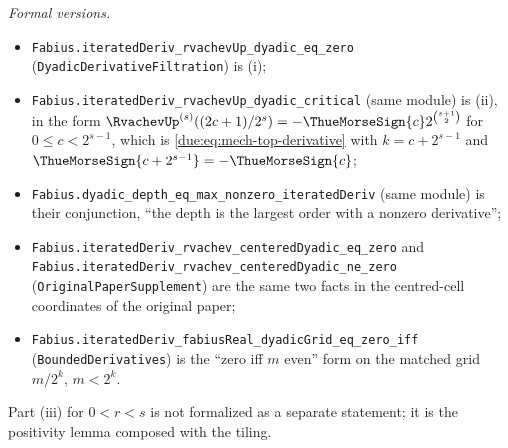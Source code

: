 \documentclass[11pt,oneside]{article}
\theoremstyle{plain}
\theoremstyle{definition}
\theoremstyle{remark}
\begin{document}
\emph{Formal versions.}
\begin{sloppypar}
\begin{itemize}
\item \texttt{Fabius.\allowbreak iteratedDeriv\_\allowbreak rvachevUp\_\allowbreak dyadic\_\allowbreak eq\_\allowbreak zero}
(\texttt{DyadicDerivativeFiltration}) is (i);
\item \texttt{Fabius.\allowbreak iteratedDeriv\_\allowbreak rvachevUp\_\allowbreak dyadic\_\allowbreak critical} (same
module) is (ii), in the form
\(\RvachevUp^{(s)}((2c+1)/2^{s})=-\ThueMorseSign{c}2^{\binom{s+1}{2}}\) for
\(0\le c<2^{s-1}\), which is \cref{due:eq:mech-top-derivative} with
\(k=c+2^{s-1}\) and \(\ThueMorseSign{c+2^{s-1}}=-\ThueMorseSign{c}\);
\item \texttt{Fabius.\allowbreak dyadic\_\allowbreak depth\_\allowbreak eq\_\allowbreak max\_\allowbreak nonzero\_\allowbreak iteratedDeriv} (same
module) is their conjunction, ``the depth is the largest order with a
nonzero derivative'';
\item \texttt{Fabius.\allowbreak iteratedDeriv\_\allowbreak rvachev\_\allowbreak centeredDyadic\_\allowbreak eq\_\allowbreak zero} and
\texttt{Fabius.\allowbreak iteratedDeriv\_\allowbreak rvachev\_\allowbreak centeredDyadic\_\allowbreak ne\_\allowbreak zero}
(\texttt{OriginalPaperSupplement}) are the same two facts in the
centred-cell coordinates of the original paper;
\item \texttt{Fabius.\allowbreak iteratedDeriv\_\allowbreak fabiusReal\_\allowbreak dyadicGrid\_\allowbreak eq\_\allowbreak zero\_\allowbreak iff}
(\texttt{BoundedDerivatives}) is the ``zero iff \(m\) even'' form on the
matched grid \(m/2^{k}\), \(m<2^{k}\).
\end{itemize}
\end{sloppypar}
Part (iii) for \(0<r<s\) is not formalized as a separate statement; it is
the positivity lemma composed with the tiling.
\end{document}
